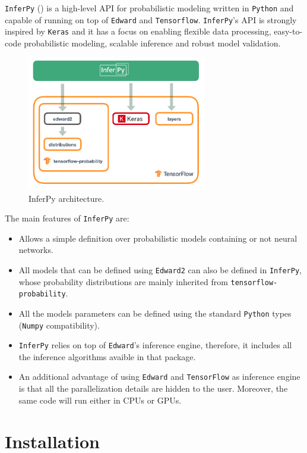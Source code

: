 
\texttt{InferPy} (\cite{cozar2019inferpy}) is a high-level API for probabilistic modeling written in \texttt{Python} and capable of running on top of \texttt{Edward} and \texttt{Tensorflow}. \texttt{InferPy}'s API is strongly inspired by \texttt{Keras} and it has a focus on enabling flexible data processing, easy-to-code probabilistic modeling, scalable inference and robust model validation.

\begin{figure}[h!]
    \centering
    \includegraphics[width=0.7\textwidth]{Chapters/InferPy/images/arch.png}
    \caption{InferPy architecture.}
\end{figure}

The main features of \texttt{InferPy} are:
\begin{itemize}
    \item Allows a simple definition over probabilistic models containing or not neural networks.
    \item All models that can be defined using \texttt{Edward2} can also be defined in  \texttt{InferPy}, whose probability distributions are mainly inherited from \texttt{tensorflow-probability}.
    \item All the models parameters can be defined using the standard \texttt{Python} types (\texttt{Numpy} compatibility).
    \item \texttt{InferPy} relies on top of \texttt{Edward}'s inference engine, therefore, it includes all the inference algorithms avaible in that package.
    \item An additional advantage of using \texttt{Edward} and \texttt{TensorFlow} as inference engine is that all the parallelization details are hidden to the user. Moreover, the same code will run either in CPUs or GPUs.
\end{itemize}

\section{Installation}

